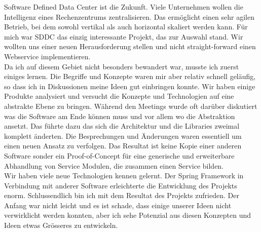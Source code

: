Software Defined Data Center ist die Zukunft. Viele Unternehmen wollen die Intelligenz eines Rechenzentrums zentralisieren. Das ermöglicht einen sehr agilen Betrieb, bei dem sowohl vertikal als auch horizontal skaliert werden kann. Für mich war SDDC das einzig interessante Projekt, das zur Auswahl stand. Wir wollten uns einer neuen Herausforderung stellen und nicht straight-forward einen Webservice implementieren.\\

Da ich auf diesem Gebiet nicht besonders bewandert war, musste ich zuerst einiges lernen. Die Begriffe und Konzepte waren mir aber relativ schnell geläufig, so dass ich in Diskussionen meine Ideen gut einbringen konnte. Wir haben einige Produkte analysiert und versucht die Konzepte und Technologien auf eine abstrakte Ebene zu bringen. Während den Meetings wurde oft darüber diskutiert was die Software am Ende können muss und vor allem wo die Abstraktion ansetzt. Das führte dazu das sich die Architektur und die Libraries zweimal komplett änderten. Die Besprechungen und Änderungen waren essentiell um einen neuen Ansatz zu verfolgen. Das Resultat ist keine Kopie einer anderen Software sonder ein Proof-of-Concept für eine generische und erweiterbare Abhandlung von Service Modulen, die zusammen einen Service bilden.\\

Wir haben viele neue Technologien kennen gelernt. Der Spring Framework in Verbindung mit anderer Software erleichterte die Entwicklung des Projekts enorm. Schlussendlich bin ich mit dem Resultat des Projekts zufrieden. Der Anfang war nicht leicht und es ist schade, dass einige unserer Ideen nicht verwirklicht werden konnten, aber ich sehe Potenzial aus diesen Konzepten und Ideen etwas Grösseres zu entwickeln.
